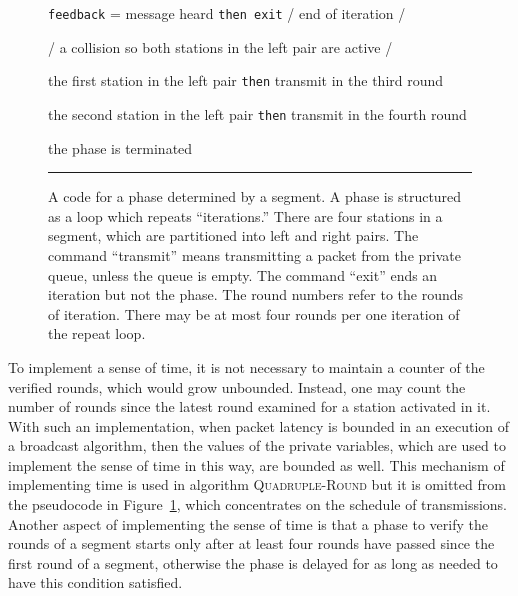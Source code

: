 \documentclass[11pt]{article}
\newcommand{\FFF}{\vspace*{\bigskipamount}}
\newcommand{\B}{\vspace*{-\smallskipamount}}
\newcommand{\BB}{\vspace*{-\medskipamount}}
\newcommand{\Item}{\B\item}
\newlength{\pagewidth}
\newlength{\captionwidth}
\begin{document}
\begin{figure}[t]
\begin{center}
\begin{minipage}{\pagewidth}
\begin{description}
\begin{description}
\begin{description}
\begin{description}
\end{description}

\Item[\tt else if] \texttt{feedback} = message heard \texttt{then exit} / end of iteration /

\Item[\tt else] / a collision so both stations in the left pair are active /

\begin{description}

\Item[\tt if] the first station in the left pair \texttt{then} transmit in the third round

\Item[\tt else if] the second station in the left pair \texttt{then} transmit in the fourth round

\end{description}

\end{description}

\end{description}
\BB
\Item[\tt until] the phase is terminated

\end{description}

\end{minipage}
\FFF

\rule{\textwidth}{0.75pt}

\parbox{\captionwidth}{\caption{\label{alg:quadruple-round}
A code for a phase determined by a segment.
A phase is structured as a loop which repeats ``iterations.''
There are four stations in a segment, which are partitioned into left and right pairs.
The command ``transmit'' means transmitting a packet from the private queue, unless the queue is empty.
The command ``exit'' ends an iteration but not the phase.
The round numbers refer to the rounds of iteration.
There may be at most four rounds per one iteration of the repeat loop.}}
\end{center}
\end{figure}





To implement a sense of time, it is not necessary to maintain a counter of the verified rounds, which  would grow unbounded.
Instead, one may count the number of rounds since the latest round examined for a station activated in it.
With such an implementation, when packet latency is bounded in an execution of a broadcast algorithm, then the values of the private variables, which are used to implement the sense of time in this way, are bounded as well.
This mechanism of implementing time is used in algorithm \textsc{Quadruple-Round} but it is omitted from  the pseudocode in Figure~\ref{alg:quadruple-round}, which concentrates on the schedule of transmissions.
Another aspect of implementing the sense of time is that a phase to verify the rounds of a segment starts only after at least four rounds have passed since the first round of a segment, otherwise the phase is delayed for as long as needed to have this condition satisfied.
\end{document}
